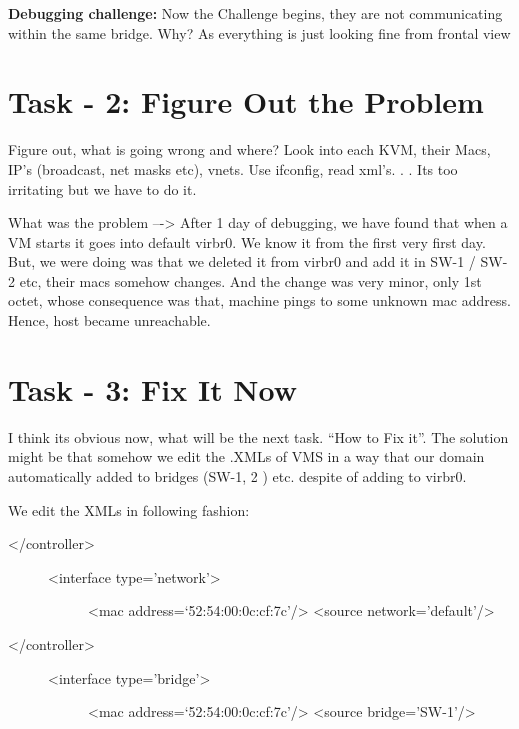 \documentclass[letterpaper,10pt,english]{sphinxmanual}
\begin{document}
\textbf{Debugging challenge:} Now the Challenge begins, they are not communicating within the same bridge. Why? As everything is just looking fine from frontal view


\section{Task - 2: Figure Out the Problem}
\label{week-04:task-2-figure-out-the-problem}
Figure out, what is going wrong and where? Look into each KVM, their Macs, IP's (broadcast, net masks etc), vnets. Use ifconfig, read xml's. . . Its too irritating but we have to do it.

What was the problem –-\textgreater{} After 1 day of debugging, we have found that when a VM starts it goes into default virbr0. We know it from the first very first day. But, we were doing was that we deleted it from virbr0 and add it in SW-1 / SW-2 etc, their macs somehow changes. And the change was very minor, only  1st octet, whose consequence was that, machine pings to some unknown mac address. Hence, host became unreachable.


\section{Task - 3: Fix It Now}
\label{week-04:task-3-fix-it-now}
I think its obvious now, what will be the next task. “How to Fix it”.
The solution might be that somehow we edit the .XMLs of VMS in a way that our domain automatically added to bridges (SW-1, 2 ) etc. despite of adding to virbr0.

We edit the XMLs in following fashion:
\begin{description}
\item[{\textless{}/controller\textgreater{}}] \leavevmode\begin{description}
\item[{\textless{}interface type='network'\textgreater{}}] \leavevmode
\textless{}mac address=`52:54:00:0c:cf:7c'/\textgreater{}
\textless{}source network='default'/\textgreater{}

\end{description}

\end{description}
\begin{description}
\item[{\textless{}/controller\textgreater{}}] \leavevmode\begin{description}
\item[{\textless{}interface type='bridge'\textgreater{}}] \leavevmode
\textless{}mac address=`52:54:00:0c:cf:7c'/\textgreater{}
\textless{}source bridge='SW-1'/\textgreater{}

\end{description}

\end{description}
\end{document}
